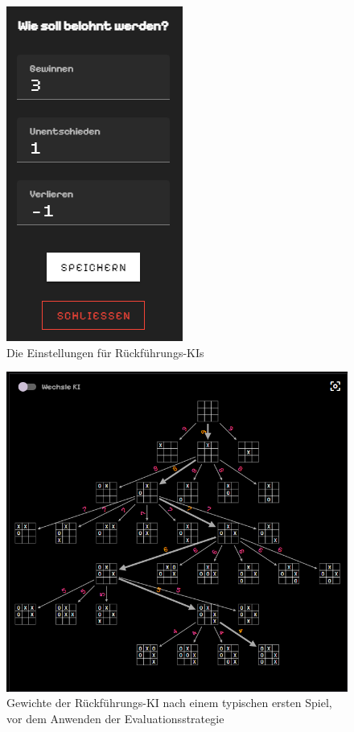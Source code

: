 \documentclass[titlepage]{scrartcl}
\begin{document}
\begin{figure}[htb]
\centering\includegraphics{rückführungEinstellungen.png}
\caption{Die Einstellungen für Rückführungs-KIs}
\label{rückführungEinstellungen}
\end{figure}

\begin{figure}[htb]
\includegraphics[width = \linewidth]{rückführungPrä.png}
\caption{Gewichte der Rückführungs-KI nach einem typischen ersten Spiel, vor dem Anwenden der Evaluationsstrategie}
\label{rückführungPrä}
\end{figure}
\end{document}
